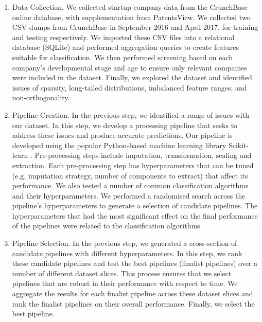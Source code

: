 \documentclass[../thesis/thesis.tex]{subfiles}
\begin{document}
\begin{enumerate}

\item Data Collection. We collected startup company data from the CrunchBase online database, with supplementation from PatentsView. We collected two CSV dumps from CrunchBase in September 2016 and April 2017, for training and testing respectively. We imported these CSV files into a relational database (SQLite) and performed aggregation queries to create features suitable for classification. We then performed screening based on each company's developmental stage and age to ensure only relevant companies were included in the dataset. Finally, we explored the dataset and identified issues of sparsity, long-tailed distributions, imbalanced feature ranges, and non-orthogonality.

\item Pipeline Creation. In the previous step, we identified a range of issues with our dataset. In this step, we develop a processing pipeline that seeks to address these issues and produce accurate predictions. Our pipeline is developed using the popular Python-based machine learning library Scikit-learn \cite{pedregosa2011}. Pre-processing steps include imputation, transformation, scaling and extraction. Each pre-processing step has hyperparameters that can be tuned (e.g. imputation strategy, number of components to extract) that affect its performance. We also tested a number of common classification algorithms and their hyperparameters. We performed a randomised search across the pipeline's hyperparameters to generate a selection of candidate pipelines. The hyperparameters that had the most significant effect on the final performance of the pipelines were related to the classification algorithms.

\item Pipeline Selection. In the previous step, we generated a cross-section of candidate pipelines with different hyperparameters. In this step, we rank these candidate pipelines and test the best pipelines (finalist pipelines) over a number of different dataset slices. This process ensures that we select pipelines that are robust in their performance with respect to time. We aggregate the results for each finalist pipeline across these dataset slices and rank the finalist pipelines on their overall performance. Finally, we select the best pipeline.



\end{enumerate}
\end{document}
